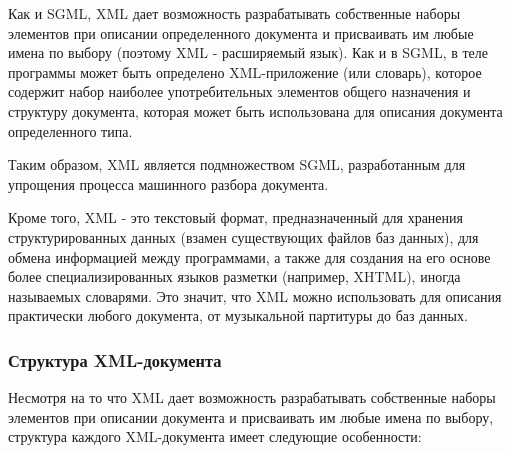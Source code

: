 \documentclass[12pt,a4paper,oneside]{article} %
\begin{document}
Как и SGML, XML дает возможность разрабатывать собственные наборы\linebreak
элементов при описании определенного документа и присваивать им\linebreak
любые имена по выбору (поэтому XML - расширяемый язык). Как и \linebreak
в SGML, в теле программы может быть определено XML-приложение \linebreak
(или словарь), которое содержит набор наиболее употребительных \linebreak
элементов общего назначения и структуру документа, которая \linebreak
может быть использована для описания документа определенного типа.

Таким образом,  XML является подмножеством SGML, разработанным \linebreak
для упрощения процесса машинного разбора документа.

Кроме того, XML - это текстовый формат, предназначенный для хранения \linebreak
структурированных данных (взамен существующих файлов баз данных), \linebreak
для обмена информацией между программами, а также для создания на его\linebreak
основе более специализированных языков разметки (например, XHTML), \linebreak
иногда называемых словарями. Это значит, что XML можно использовать \linebreak
для описания практически любого документа, от музыкальной партитуры \linebreak
до баз данных.

\subsubsection{Структура XML-документа}	

Несмотря на то что XML дает возможность разрабатывать собственные \linebreak
наборы элементов при описании документа и присваивать им\linebreak
любые имена по выбору, структура каждого XML-документа имеет \linebreak
следующие особенности:
\end{document}
